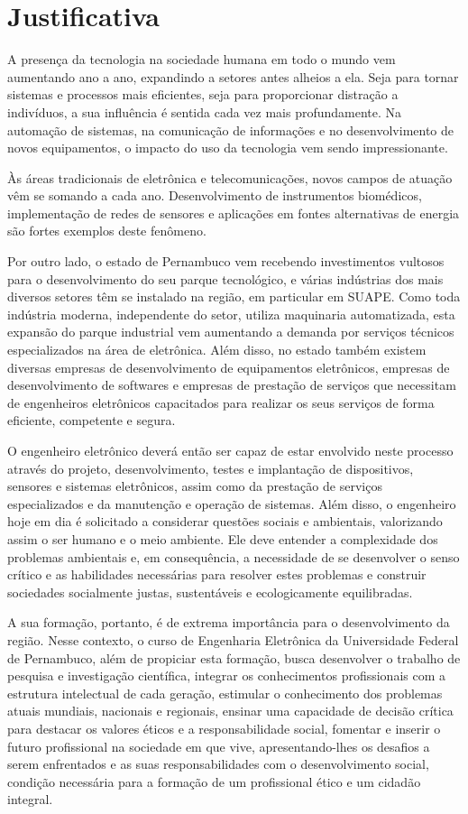 \chapter{Justificativa}
\label{cap:dois}

A presença da tecnologia na sociedade humana em todo o mundo vem aumentando ano a ano, expandindo a setores antes alheios a ela. Seja para tornar sistemas e processos mais eficientes, seja para proporcionar distração a indivíduos, a sua influência é sentida cada vez mais profundamente. Na automação de sistemas, na comunicação de informações e no desenvolvimento de novos equipamentos, o impacto do uso da tecnologia vem sendo impressionante.

Às áreas tradicionais de eletrônica e telecomunicações, novos campos de atuação vêm se somando a cada ano. Desenvolvimento de instrumentos biomédicos, implementação de redes de sensores e aplicações em fontes alternativas de energia são fortes exemplos deste fenômeno.

Por outro lado, o estado de Pernambuco vem recebendo investimentos vultosos para o desenvolvimento do seu parque tecnológico, e várias indústrias dos mais diversos setores têm se instalado na região, em particular em SUAPE. Como toda indústria moderna, independente do setor, utiliza maquinaria automatizada, esta expansão do parque industrial vem aumentando a demanda por serviços técnicos especializados na área de eletrônica. Além disso, no estado também existem diversas empresas de desenvolvimento de equipamentos eletrônicos, empresas de desenvolvimento de softwares e empresas de prestação de serviços que necessitam de engenheiros eletrônicos capacitados para realizar os seus serviços de forma eficiente, competente e segura.

O engenheiro eletrônico deverá então ser capaz de estar envolvido neste processo através do projeto, desenvolvimento, testes e implantação de dispositivos, sensores e sistemas eletrônicos, assim como da prestação de serviços especializados e da manutenção e operação de sistemas. Além disso, o engenheiro hoje em dia é solicitado a considerar questões sociais e ambientais, valorizando assim o ser humano e o meio ambiente. Ele deve entender a complexidade dos problemas ambientais e, em consequência, a necessidade de se desenvolver o senso crítico e as habilidades necessárias para resolver estes problemas e construir sociedades socialmente justas, sustentáveis e ecologicamente equilibradas.

A sua formação, portanto, é de extrema importância para o desenvolvimento da região. Nesse contexto, o curso de Engenharia Eletrônica da Universidade Federal de Pernambuco, além de propiciar esta formação, busca desenvolver o trabalho de pesquisa e investigação científica, integrar os conhecimentos profissionais com a estrutura intelectual de cada geração, estimular o conhecimento dos problemas atuais mundiais, nacionais e regionais, ensinar uma capacidade de decisão crítica para destacar os valores éticos e a responsabilidade social, fomentar e inserir o futuro profissional na sociedade em que vive, apresentando-lhes os desafios a serem enfrentados e as suas responsabilidades com o desenvolvimento social, condição necessária para a formação de um profissional ético e um cidadão integral.

